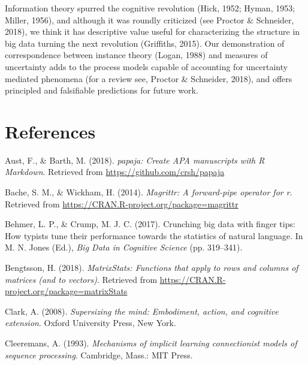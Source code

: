 \documentclass[,man,donotrepeattitle,floatsintext]{apa6}
\begin{document}
Information theory spurred the cognitive revolution (Hick, 1952; Hyman, 1953; Miller, 1956), and although it was roundly criticized (see Proctor \& Schneider, 2018), we think it has descriptive value useful for characterizing the structure in big data turning the next revolution (Griffiths, 2015). Our demonstration of correspondence between instance theory (Logan, 1988) and measures of uncertainty adds to the process models capable of accounting for uncertainty mediated phenomena (for a review see, Proctor \& Schneider, 2018), and offers principled and falsifiable predictions for future work.

\newpage

\hypertarget{references}{%
\section{References}\label{references}}

\begingroup
\setlength{\parindent}{-0.5in}
\setlength{\leftskip}{0.5in}

\hypertarget{refs}{}
\leavevmode\hypertarget{ref-R-papaja}{}%
Aust, F., \& Barth, M. (2018). \emph{papaja: Create APA manuscripts with R Markdown}. Retrieved from \url{https://github.com/crsh/papaja}

\leavevmode\hypertarget{ref-R-magrittr}{}%
Bache, S. M., \& Wickham, H. (2014). \emph{Magrittr: A forward-pipe operator for r}. Retrieved from \url{https://CRAN.R-project.org/package=magrittr}

\leavevmode\hypertarget{ref-behmer_crunching_2017}{}%
Behmer, L. P., \& Crump, M. J. C. (2017). Crunching big data with finger tips: How typists tune their performance towards the statistics of natural language. In M. N. Jones (Ed.), \emph{Big Data in Cognitive Science} (pp. 319--341).

\leavevmode\hypertarget{ref-R-matrixStats}{}%
Bengtsson, H. (2018). \emph{MatrixStats: Functions that apply to rows and columns of matrices (and to vectors)}. Retrieved from \url{https://CRAN.R-project.org/package=matrixStats}

\leavevmode\hypertarget{ref-clark_supersizing_2008}{}%
Clark, A. (2008). \emph{Supersizing the mind: Embodiment, action, and cognitive extension}. Oxford University Press, New York.

\leavevmode\hypertarget{ref-cleeremans_mechanisms_1993}{}%
Cleeremans, A. (1993). \emph{Mechanisms of implicit learning connectionist models of sequence processing}. Cambridge, Mass.: MIT Press.
\end{document}
